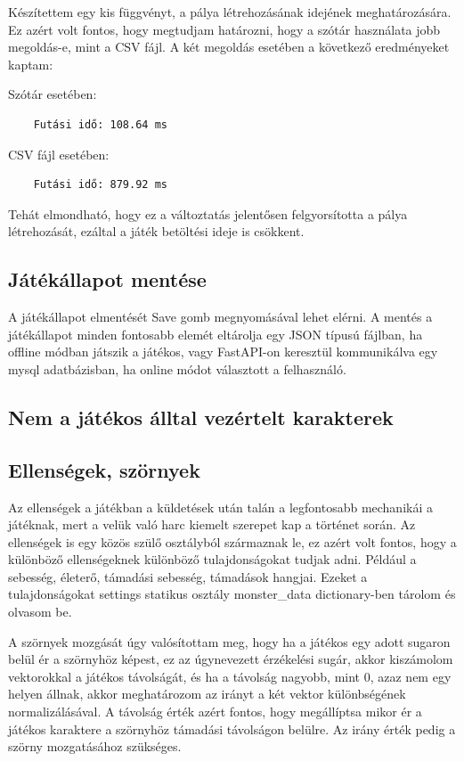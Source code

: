 Készítettem egy kis függvényt, a pálya létrehozásának idejének meghatározására. Ez azért volt fontos, hogy megtudjam határozni, hogy a szótár használata jobb megoldás-e, mint a CSV fájl. A két megoldás esetében a következő eredményeket kaptam:

Szótár esetében:
\begin{verbatim}
    Futási idő: 108.64 ms
\end{verbatim}
CSV fájl esetében:
\begin{verbatim}
    Futási idő: 879.92 ms
\end{verbatim}

\indent \indent Tehát elmondható, hogy ez a változtatás jelentősen felgyorsította a pálya létrehozását, ezáltal a játék betöltési ideje is csökkent.


\subsection{Játékállapot mentése}
\indent \indent A játékállapot elmentését Save gomb megnyomásával lehet elérni. A mentés a játékállapot minden fontosabb elemét eltárolja egy JSON típusú fájlban, ha offline módban játszik a játékos, vagy FastAPI-on keresztül kommunikálva egy mysql adatbázisban, ha online módot választott a felhasználó.


\subsection{Nem a játékos álltal vezértelt karakterek}

\subsection{Ellenségek, szörnyek}

\indent \indent Az ellenségek a játékban a küldetések után talán a legfontosabb mechanikái a játéknak, mert a velük való harc kiemelt szerepet kap a történet során.
Az ellenségek is egy közös szülő osztályból származnak le, ez azért volt fontos, hogy a különböző ellenségeknek különböző tulajdonságokat tudjak adni. Például a sebesség, életerő, támadási sebesség, támadások hangjai. Ezeket a tulajdonságokat settings statikus osztály monster\_data dictionary-ben tárolom és olvasom be.

A szörnyek mozgását úgy valósítottam meg, hogy ha a játékos egy adott sugaron belül ér a szörnyhöz képest, ez az úgynevezett érzékelési sugár, akkor kiszámolom vektorokkal a játékos távolságát, és ha a távolság nagyobb, mint 0, azaz nem egy helyen állnak, akkor meghatározom az irányt a két vektor különbségének normalizálásával. A távolság érték azért fontos, hogy megállíptsa mikor ér a játékos karaktere a szörnyhöz támadási távolságon belülre. Az irány érték pedig a szörny mozgatásához szükséges.

